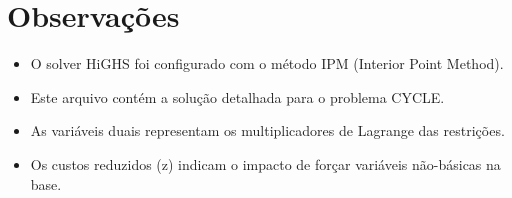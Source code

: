 \documentclass[12pt]{article}
\begin{document}
\section{Observações}

\begin{itemize}
\item O solver HiGHS foi configurado com o método IPM (Interior Point Method).
\item Este arquivo contém a solução detalhada para o problema CYCLE.
\item As variáveis duais representam os multiplicadores de Lagrange das restrições.
\item Os custos reduzidos (z) indicam o impacto de forçar variáveis não-básicas na base.
\end{itemize}
\end{document}
